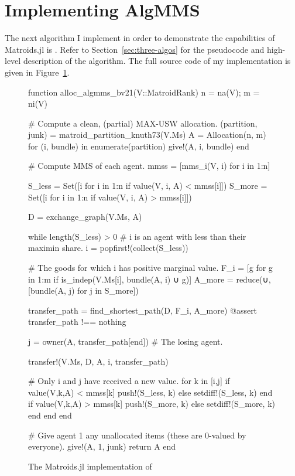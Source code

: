 \section{Implementing AlgMMS}
The next algorithm I implement in order to demonstrate the capabilities of Matroids.jl is . Refer to Section~\ref{sec:three-algos} for the pseudocode and high-level description of the algorithm. The full source code of my implementation is given in Figure~\ref{code:AlgMMS}.

\begin{figure}[ht!]
\begin{jllisting}
function alloc_algmms_bv21(V::MatroidRank)
  n = na(V); m = ni(V)

  # Compute a clean, (partial) MAX-USW allocation.
  (partition, junk) = matroid_partition_knuth73(V.Ms)
  A = Allocation(n, m)
  for (i, bundle) in enumerate(partition)
    give!(A, i, bundle)
  end

  # Compute MMS of each agent.
  mmss = [mms_i(V, i) for i in 1:n]

  S_less = Set([i for i in 1:n if value(V, i, A) < mmss[i]])
  S_more = Set([i for i in 1:n if value(V, i, A) > mmss[i]])

  D = exchange_graph(V.Ms, A)

  while length(S_less) > 0
    # i is an agent with less than their maximin share.
    i = popfirst!(collect(S_less))

    # The goods for which i has positive marginal value.
    F_i = [g for g in 1:m if is_indep(V.Ms[i], bundle(A, i) ∪ g)]
    A_more = reduce(∪, [bundle(A, j) for j in S_more])

    transfer_path = find_shortest_path(D, F_i, A_more)
    @assert transfer_path !== nothing

    j = owner(A, transfer_path[end]) # The losing agent.
    
    transfer!(V.Ms, D, A, i, transfer_path)

    # Only i and j have received a new value.
    for k in [i,j]
      if value(V,k,A) < mmss[k] push!(S_less, k) else setdiff!(S_less, k) end
      if value(V,k,A) > mmss[k] push!(S_more, k) else setdiff!(S_more, k) end
    end
  end

  # Give agent 1 any unallocated items (these are 0-valued by everyone).
  give!(A, 1, junk)
  return A
end
\end{jllisting}
\caption{The Matroids.jl implementation of }
\label{code:AlgMMS}
\end{figure}

